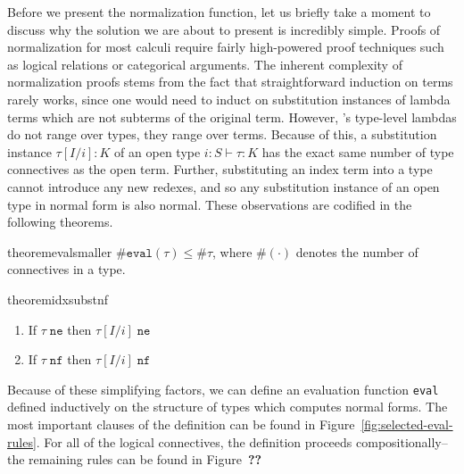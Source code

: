 Before we present the normalization function, let us briefly take a moment to discuss why the solution we are about to present is incredibly simple. Proofs of normalization for most calculi require fairly high-powered proof techniques such as logical relations or categorical arguments. The inherent complexity of normalization proofs stems from the fact that straightforward induction on terms rarely works, since one would need to induct on substitution instances of lambda terms which are not subterms of the original term. However, \dlambdaamor's type-level lambdas do not range over types, they range over terms. Because of this, a substitution instance $\tau[I/i] : K$ of an open type $i : S \vdash \tau : K$ has the exact same number of type connectives as the open term. Further, substituting an index term into a type cannot introduce any new redexes, and so any substitution instance of an open type in normal form is also normal. These observations are codified in the following theorems.

\begin{restatable}{theorem}{evalsmaller}
$\#\texttt{eval}(\tau) \leq \#\tau$, where $\#(\cdot)$ denotes the number of connectives in a type.
\end{restatable}


\begin{restatable}{theorem}{idxsubstnf}
~\begin{enumerate}
  \item If $\tau \; \texttt{ne}$ then $\tau[I/i] \; \texttt{ne}$
  \item If $\tau \; \texttt{nf}$ then $\tau[I/i] \; \texttt{nf}$
\end{enumerate}
\label{thm:idx-subst-nf}
\end{restatable}

Because of these simplifying factors, we can define an evaluation function \texttt{eval} defined inductively on the structure of types which computes normal forms.
The most important clauses of the definition can be found in Figure~\ref{fig:selected-eval-rules}. For all of the logical connectives, the definition proceeds compositionally-- the remaining rules can be found in Figure~\textbf{??}

